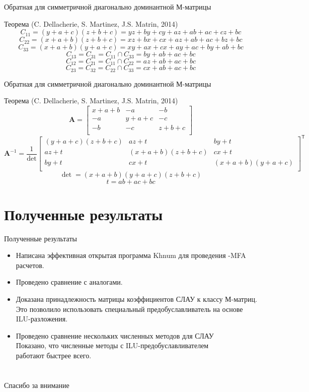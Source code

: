 \documentclass[aspectratio=169]{beamer}
\begin{document}
\begin{frame}{Обратная для симметричной диагонально доминантной М-матрицы}
\begin{block}{Теорема (C. Dellacherie, S. Martinez, J.S. Matrin, 2014)}
		$$C_{11} = (y + a + c)(z + b + c) = yz + by + cy + az + ab + ac + cz + bc$$
		$$C_{22} = (x + a + b)(z + b + c) = xz + bx + cx + az + ab + ac + bz + bc$$
		$$C_{33} = (x + a + b)(y + a + c) = xy + ax + cx + ay + ac + by + ab + bc$$ \pause
		$$C_{13} = C_{31} = C_{11} \cap C_{33} = by + ab + ac + bc$$
		$$C_{12} = C_{21} = C_{11} \cap C_{22} = az + ab + ac + bc$$
		$$C_{23} = C_{32} = C_{22} \cap C_{33} = cx + ab + ac + bc$$
\end{block}
\end{frame}

\begin{frame}{Обратная для симметричной диагонально доминантной М-матрицы}
\begin{block}{Теорема (C. Dellacherie, S. Martinez, J.S. Matrin, 2014)}
	$$\mathbf{A} = \begin{bmatrix}
	x + a + b & -a & -b\\
	-a & y + a + c & -c\\
	-b & -c & z + b +c\\
	\end{bmatrix}$$
	$$\mathbf{A}^{-1} = \frac{1}{\operatorname{det}} \begin{bmatrix}
	(y + a + c)(z + b + c) & az + t & by + t\\
	az + t & (x + a + b)(z + b + c) & cx + t\\
	by + t & cx + t & (x + a + b)(y + a + c)\\
	\end{bmatrix}^{\mathsf{T}}$$
	$$\operatorname{det} = (x + a + b)(y + a + c)(z + b + c)$$
	$$t = ab + ac + bc$$
\end{block}
\end{frame}

\section{Полученные результаты}
\begin{frame}{Полученные результаты}
	\begin{itemize}
		\item Написана эффективная открытая программа Khnum для проведения -MFA расчетов.
		\item Проведено сравнение с аналогами.
		\item Доказана принадлежность матрицы коэффициентов СЛАУ к классу М-матриц. Это позволило использовать специальный предобуславливатель на основе ILU-разложения.
		\item Проведено сравнение нескольких численных методов для СЛАУ \\ Показано, что численные методы с ILU-предобуславливателем\\ работают быстрее всего.
	\end{itemize}
\end{frame}

\section*{}
\begin{frame}
	\centering
	\Large
	Спасибо за внимание
\end{frame}
\end{document}
